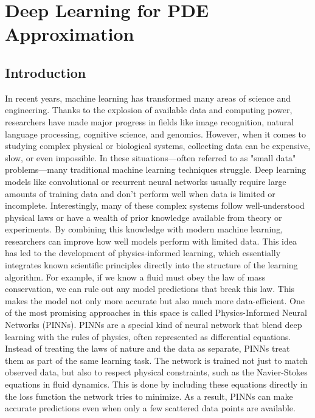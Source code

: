 \documentclass[11pt,twoside,openright]{report}
\begin{document}
\chapter{Deep Learning for PDE Approximation}
\label{ch:introduction}

\section{Introduction}
\label{sec:Resources}

In recent years, machine learning has transformed many areas of science and engineering. Thanks to the explosion of available data and computing power, researchers have made major progress in fields like image recognition, natural language processing, cognitive science, and genomics. However, when it comes to studying complex physical or biological systems, collecting data can be expensive, slow, or even impossible. In these situations—often referred to as "small data" problems—many traditional machine learning techniques struggle. Deep learning models like convolutional or recurrent neural networks usually require large amounts of training data and don’t perform well when data is limited or incomplete.
Interestingly, many of these complex systems follow well-understood physical laws or have a wealth of prior knowledge available from theory or experiments. By combining this knowledge with modern machine learning, researchers can improve how well models perform with limited data. This idea has led to the development of physics-informed learning, which essentially integrates known scientific principles directly into the structure of the learning algorithm. For example, if we know a fluid must obey the law of mass conservation, we can rule out any model predictions that break this law. This makes the model not only more accurate but also much more data-efficient.
One of the most promising approaches in this space is called Physics-Informed Neural Networks (PINNs). PINNs are a special kind of neural network that blend deep learning with the rules of physics, often represented as differential equations. Instead of treating the laws of nature and the data as separate, PINNs treat them as part of the same learning task. The network is trained not just to match observed data, but also to respect physical constraints, such as the Navier-Stokes equations in fluid dynamics. This is done by including these equations directly in the loss function the network tries to minimize. As a result, PINNs can make accurate predictions even when only a few scattered data points are available.
\end{document}
